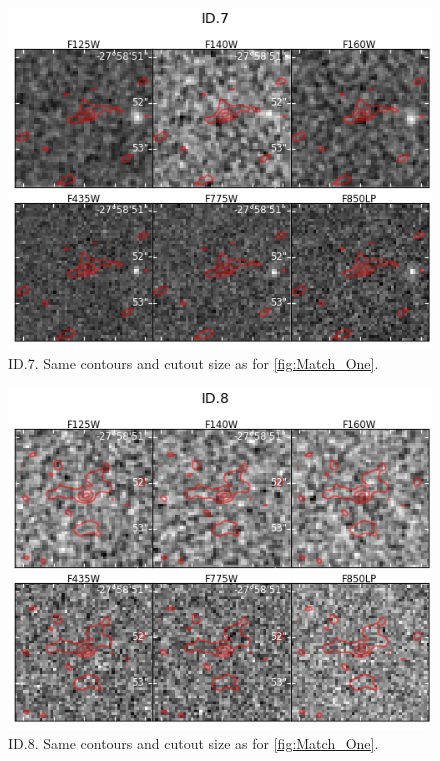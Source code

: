 \begin{figure}[tbp]
\centering \includegraphics[width=160mm]{Matched/ASPECS_Cutout_6.jpg}
\caption{ID.7. Same contours and cutout size as for \ref{fig:Match_One}.}
\label{fig:Match_Three}
\end{figure}

\begin{figure}[tbp]
\centering \includegraphics[width=160mm]{Matched/ASPECS_Cutout_7.jpg}
\caption{ID.8. Same contours and cutout size as for \ref{fig:Match_One}.}
\label{fig:Match_Three}
\end{figure}

